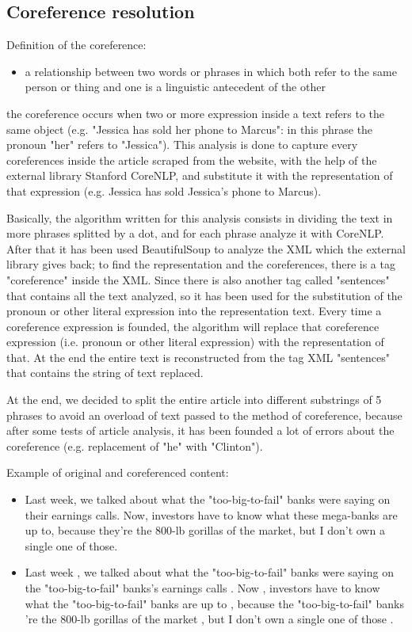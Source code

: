 \subsection{Coreference resolution}
Definition of the coreference:
\begin{itemize}
	\item a relationship between two words or phrases in which both refer to the same person or thing and one is a linguistic antecedent of the other
\end{itemize}
the coreference occurs when two or more expression inside a text refers to the same object (e.g. "Jessica has sold her phone to Marcus": in this phrase the pronoun "her" refers to "Jessica"). 
This analysis is done to capture every coreferences inside the article scraped from the website, with the help of the external library Stanford CoreNLP, and substitute it with the representation of that expression (e.g. Jessica has sold Jessica's phone to Marcus).
\par 
Basically, the algorithm written for this analysis consists in dividing the text in more phrases splitted by a dot, and for each phrase analyze it with CoreNLP. 
After that it has been used BeautifulSoup to analyze the XML which the external library gives back; to find the representation and the coreferences, there is a tag "coreference" inside the XML. 
Since there is also another tag called "sentences" that contains all the text analyzed, so it has been used for the substitution of the pronoun or other literal expression into the representation text. 
Every time a coreference expression is founded, the algorithm will replace that coreference expression (i.e. pronoun or other literal expression) with the representation of that. 
At the end the entire text is reconstructed from the tag XML "sentences" that contains the string of text replaced.
\par
At the end, we decided to split the entire article into different substrings of 5 phrases to avoid an overload of text passed to the method of coreference, because after some tests of article analysis, it has been founded a lot of errors about the coreference (e.g. replacement of "he" with "Clinton"). 
\par
Example of original and coreferenced content:
\begin{itemize}
	\item Last week, we talked about what the "too-big-to-fail" banks were saying on their earnings calls. Now, investors have to know what these mega-banks are up to, because they're the 800-lb gorillas of the market, but I don't own a single one of those.
	\item Last week , we talked about what the "too-big-to-fail" banks were saying on the "too-big-to-fail" banks's earnings calls . Now , investors have to know what the "too-big-to-fail" banks are up to , because the "too-big-to-fail" banks 're the 800-lb gorillas of the market , but I don't own a single one of those .
\end{itemize}

